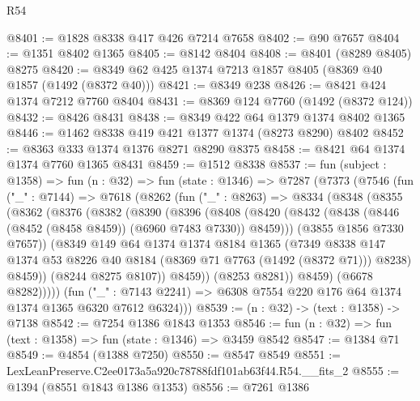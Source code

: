 \begin{lexlean}{R54}
\begin{coremodule}
@8401 := @1828 @8338 @417 @426 @7214 @7658
@8402 := @90 @7657
@8404 := @1351 @8402 @1365
@8405 := @8142 @8404
@8408 := @8401 (@8289 @8405) @8275
@8420 := @8349 @62 @425 @1374 @7213 @1857 @8405 (@8369 @40 @1857 (@1492 (@8372 @40)))
@8421 := @8349 @238
@8426 := @8421 @424 @1374 @7212 @7760 @8404
@8431 := @8369 @124 @7760 (@1492 (@8372 @124))
@8432 := @8426 @8431
@8438 := @8349 @422 @64 @1379 @1374 @8402 @1365
@8446 := @1462 @8338 @419 @421 @1377 @1374 (@8273 @8290) @8402
@8452 := @8363 @333 @1374 @1376 @8271 @8290 @8375
@8458 := @8421 @64 @1374 @1374 @7760 @1365 @8431
@8459 := @1512 @8338
@8537 := fun (subject : @1358) =>
  fun (n : @32) =>
  fun (state : @1346) =>
  @7287
    (@7373
      (@7546
        (fun ("_" : @7144) =>
        @7618
          (@8262
            (fun ("_" : @8263) =>
            @8334
              (@8348
                (@8355
                  (@8362
                    (@8376
                      (@8382
                        (@8390
                          (@8396
                            (@8408
                              (@8420
                                (@8432
                                  (@8438 (@8446 (@8452 (@8458 @8459)) (@6960 @7483 @7330)) @8459)))
                              (@3855 @1856 @7330 @7657))
                            (@8349
                              @149
                              @64
                              @1374
                              @1374
                              @8184
                              @1365
                              (@7349
                                @8338
                                @147
                                @1374
                                @53
                                @8226
                                @40
                                @8184
                                (@8369 @71 @7763 (@1492 (@8372 @71)))
                                @8238)
                              @8459))
                          (@8244 @8275 @8107))
                        @8459))
                    (@8253 @8281))
                  @8459)
                (@6678 @8282)))))
        (fun ("_" : @7143 @2241) => @6308 @7554 @220 @176 @64 @1374 @1374 @1365 @6320 @7612 @6324)))
@8539 := (n : @32) -> (text : @1358) -> @7138
@8542 := @7254 @1386 @1843 @1353
@8546 := fun (n : @32) => fun (text : @1358) => fun (state : @1346) => @3459 @8542
@8547 := @1384 @71
@8549 := @4854 (@1388 @7250)
@8550 := @8547 @8549
@8551 := LexLeanPreserve.C2ee0173a5a920c78788fdf101ab63f44.R54.__fits_2
@8555 := @1394 (@8551 @1843 @1386 @1353)
@8556 := @7261 @1386

\end{coremodule}
\end{lexlean}
